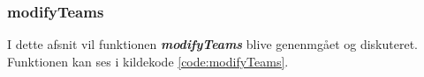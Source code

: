 \subsubsection{modifyTeams}\label{modifyTeamsAfsnit}
I dette afsnit vil funktionen \textbf{\textit{modifyTeams}} blive genenmgået og diskuteret. Funktionen kan ses i kildekode \ref{code:modifyTeams}.

